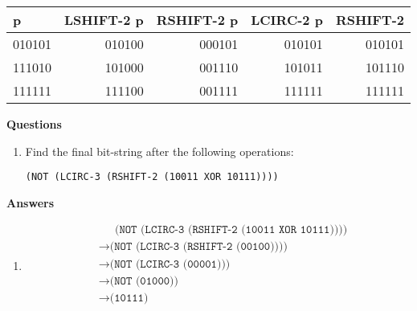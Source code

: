 \documentclass[12pt,letterpaper]{article}
\begin{document}
\begin{center}
  \begin{tabular}{| l || r | r | r | r |}
    \hline
    p & \textbf{LSHIFT-2} p & \textbf{RSHIFT-2} p & \textbf{LCIRC-2} p & \textbf{RSHIFT-2} \\
    \hline \hline
    010101 & 010100 & 000101 & 010101 & 010101 \\
    111010 & 101000 & 001110 & 101011 & 101110 \\
    111111 & 111100 & 001111 & 111111 & 111111 \\
    \hline
  \end{tabular}
\end{center}

\bigskip
\noindent \textbf{Questions}
\begin{enumerate}
\item Find the final bit-string after the following operations:
  
  \texttt{(NOT (LCIRC-3 (RSHIFT-2 (10011 XOR 10111))))}

\end{enumerate}

\pagebreak
\noindent \textbf{Answers}

\begin{enumerate}

\item \begin{align*}
  &\phantom{\rightarrow\ \ } \texttt{(NOT (LCIRC-3 (RSHIFT-2 (10011 XOR 10111))))} \\
  &\rightarrow \texttt{(NOT (LCIRC-3 (RSHIFT-2 (00100))))} \\
  &\rightarrow \texttt{(NOT (LCIRC-3 (00001)))} \\
  &\rightarrow \texttt{(NOT (01000))} \\
  &\rightarrow \texttt{(10111)} \\
\end{align*}

\end{enumerate}
\end{document}
